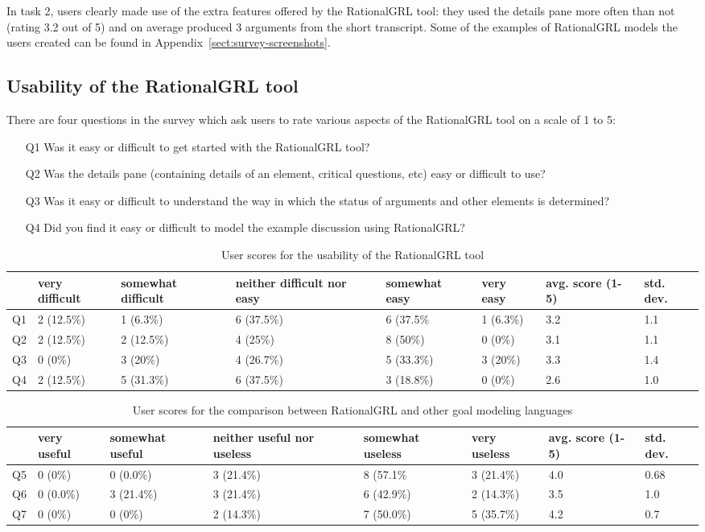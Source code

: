 In task 2, users clearly made use of the extra features offered by the RationalGRL tool: they used the details pane more often than not (rating 3.2 out of 5) and on average produced 3 arguments from the short transcript. Some of the examples of RationalGRL models the users created can be found in Appendix~\ref{sect:survey-screenshots}.

\subsection{Usability of the RationalGRL tool}

There are four questions in the survey which ask users to rate various aspects of the RationalGRL tool on a scale of 1 to 5:
\begin{itemize}
\item[Q1] Was it easy or difficult to get started with the RationalGRL tool?
\item[Q2] Was the details pane (containing details of an element, critical questions, etc) easy or difficult to use?
\item[Q3] Was it easy or difficult to understand the way in which the status of arguments and other elements is determined?
\item[Q4] Did you find it easy or difficult to model the example discussion using RationalGRL?
\end{itemize}

\begin{table*}[t]
\centering
\begin{tabularx}{0.95\textwidth}{l|l|l|l|l|l|l|l}
& very difficult & somewhat difficult & neither difficult nor easy & somewhat easy & very easy & avg. score (1-5) & std. dev.\\
\hline
Q1 & 2 (12.5\%) & 1 (6.3\%) & 6 (37.5\%) & 6 (37.5\% & 1 (6.3\%) & 3.2 & 1.1\\
Q2 & 2 (12.5\%) & 2 (12.5\%) & 4 (25\%) & 8 (50\%) & 0 (0\%) & 3.1 & 1.1\\
Q3 & 0 (0\%) & 3 (20\%) & 4 (26.7\%) & 5 (33.3\%) & 3 (20\%) & 3.3 & 1.4\\
Q4 & 2 (12.5\%) & 5 (31.3\%) & 6 (37.5\%) & 3 (18.8\%) & 0 (0\%) & 2.6 & 1.0
\end{tabularx}
\caption{User scores for the usability of the RationalGRL tool}
\label{table:survey:table1}
\end{table*}

\begin{table*}[t]
\centering
\begin{tabularx}{0.95\textwidth}{l|l|l|l|l|l|l|l}
& very useful & somewhat useful & neither useful nor useless & somewhat useless & very useless & avg. score (1-5) & std. dev.\\
\hline
Q5 & 0 (0\%) & 0 (0.0\%) & 3 (21.4\%) & 8 (57.1\% & 3 (21.4\%) & 4.0 & 0.68\\
Q6 & 0 (0.0\%) & 3 (21.4\%) & 3 (21.4\%) & 6 (42.9\%) & 2 (14.3\%) & 3.5 & 1.0\\
Q7 & 0 (0\%) & 0 (0\%) & 2 (14.3\%) & 7 (50.0\%) & 5 (35.7\%) & 4.2 & 0.7
\end{tabularx}
\caption{User scores for the comparison between RationalGRL and other goal modeling languages}
\label{table:survey:table2}
\end{table*}

